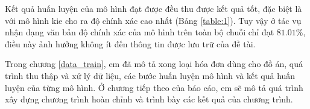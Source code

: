 Kết quả huấn luyện của mô hình đạt được đều thu được kết quả tốt, đặc biệt là với mô hình \acrshort*{kie} cho ra độ chính xác cao nhất (Bảng \ref{table:1}). Tuy vậy ở tác vụ nhận dạng văn bản độ chính xác của mô hình trên toàn bộ chuỗi chỉ đạt $81.01\%$, điều này ảnh hưởng không ít đến thông tin được lưu trữ của đề tài.

Trong chương \ref{data_train}, em đã mô tả xong loại hóa đơn dùng cho đồ án, quá trình thu thập và xử lý dữ liệu, các bước huấn luyện mô hình và kết quả huấn luyện của từng mô hình. Ở chương tiếp theo của báo cáo, em sẽ mô tả quá trình xây dựng chương trình hoàn chỉnh và trình bày các kết quả của chương trình.
